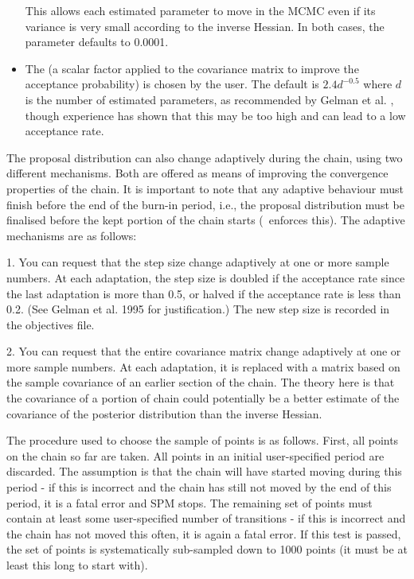 \begin{itemize}
This allows each estimated parameter to move in the MCMC even if its variance is very small according to the inverse Hessian. In both cases, the  parameter defaults to 0.0001.

\item The  (a scalar factor applied to the covariance matrix to improve the acceptance probability) is chosen by the user. The default is $2.4d^{-0.5}$ where $d$ is the number of estimated parameters, as recommended by Gelman et al. \citep{823}, though experience has shown that this may be too high and can lead to a low acceptance rate. 
\end{itemize}

The proposal distribution can also change adaptively during the chain, using two different mechanisms. Both are offered as means of improving the convergence properties of the chain. It is important to note that any adaptive behaviour must finish before the end of the burn-in period, i.e., the proposal distribution must be finalised before the kept portion of the chain starts (\SPM\ enforces this). The adaptive mechanisms are as follows: 

1.	You can request that the step size change adaptively at one or more sample numbers. At each adaptation, the step size is doubled if the acceptance rate since the last adaptation is more than 0.5, or halved if the acceptance rate is less than 0.2. (See Gelman et al. 1995 for justification.) The new step size is recorded in the objectives file. 

2.	You can request that the entire covariance matrix change adaptively at one or more sample numbers. At each adaptation, it is replaced with a matrix based on the sample covariance of an earlier section of the chain. The theory here is that the covariance of a portion of chain could potentially be a better estimate of the covariance of the posterior distribution than the inverse Hessian.

	The procedure used to choose the sample of points is as follows. First, all points on the chain so far are taken. All points in an initial user-specified period are discarded. The assumption is that the chain will have started moving during this period - if this is incorrect and the chain has still not moved by the end of this period, it is a fatal error and SPM stops. The remaining set of points must contain at least some user-specified number of transitions - if this is incorrect and the chain has not moved this often, it is again a fatal error. If this test is passed, the set of points is systematically sub-sampled down to 1000 points (it must be at least this long to start with).

